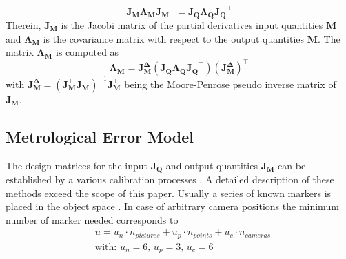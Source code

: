 \documentclass[5p,times,procedia]{elsarticle}
\begin{document}
\begin{equation}
	\mathbf{J_{M}}\mathbf{\Lambda_{M}}\mathbf{J_{M}}^{\top} = \mathbf{J_{Q}}\mathbf{\Lambda_{Q}}\mathbf{J_{Q}}^{\top}
\end{equation}
Therein, $\mathbf{J_{M}}$ is the Jacobi matrix of the partial derivatives input quantities $\mathbf{M}$ and $\mathbf{\Lambda_{M}}$ is the covariance matrix with respect to the output quantities $\mathbf{M}$.
The matrix $\mathbf{\Lambda_{M}}$ is computed as
\begin{equation}
	\mathbf{\Lambda_{M}} = \mathbf{J_{M}^{\Delta}} \left( \mathbf{J_{Q}}\mathbf{\Lambda_{Q}}\mathbf{J_{Q}}^{\top}\right) \left(\mathbf{J_{M}^{\Delta}}\right)^{\top}
\end{equation}
with $ \mathbf{J_{M}^{\Delta}} = \left( \mathbf{J_{M}^{\top}} \mathbf{J_{M}^{}} \right)^{-1}\mathbf{J_{M}^{\top}}$ being the Moore-Penrose pseudo inverse matrix of $\mathbf{J_M}$.
%
\subsection{Metrological Error Model}
\label{met_err_model}
%
The design matrices for the input $\mathbf{J_{Q}}$ and output quantities $\mathbf{J_{M}}$ can be established by a various calibration processes \cite{Hartley2018}.  A detailed description of these methods exceed the scope of this paper. Usually a series of known markers is placed in the object space \cite{Luhmann2003}. In case of arbitrary camera positions the minimum number of marker needed corresponds to
\begin{equation}
	\label{eqn:NumCalibPoints}
	\begin{aligned}
		& 	u = u_n \cdot n_{pictures} + u_p \cdot n_{points} + u_c \cdot n_{cameras} \\
		& \text{with: } u_n = 6\text{, } u_p = 3\text{, } u_c = 6 
	\end{aligned}
\end{equation}
\end{document}
